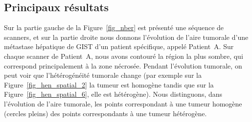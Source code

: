 \documentclass[11pt]{amsart}
\numberwithin{equation}{section}
\newcommand{\Nber}{Patient~A\xspace}
\begin{document}
\subsection*{Principaux résultats}
Sur la partie gauche de la Figure~\ref{fig_nber} est présenté une séquence de scanners, et sur la partie droite nous donnons l'évolution de l'aire tumorale d'une métastase hépatique de GIST d'un patient spécifique, appelé \Nber. Sur chaque scanner de \Nber, nous avons contouré la région la plus sombre, qui correspond principalement à la zone nécrosée.  
Pendant l'évolution tumorale, on peut voir que l'hétérogénéité tumorale change (par exemple sur la Figure~\ref{fig_hen_spatial_2} la tumeur est homogène tandis que sur la Figure~\ref{fig_hen_spatial_6}, elle est hétérogène). Nous distinguons, dans l'évolution de l'aire tumorale,  les points correspondant à une tumeur homogène (cercles pleins) des points correspondants à une tumeur hétérogène.
\end{document}
